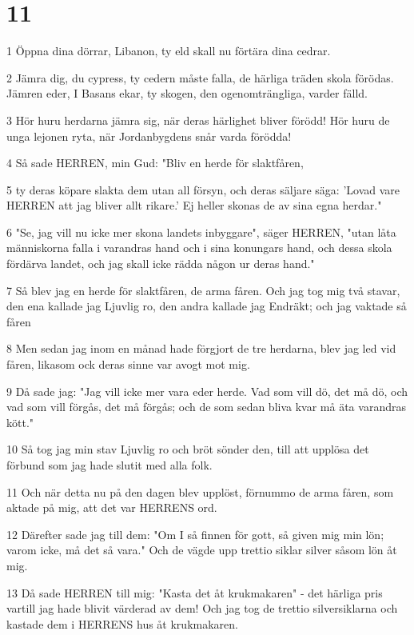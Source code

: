 \chapter{11}

\par 1 Öppna dina dörrar, Libanon, ty eld skall nu förtära dina cedrar.
\par 2 Jämra dig, du cypress, ty cedern måste falla, de härliga träden skola förödas. Jämren eder, I Basans ekar, ty skogen, den ogenomträngliga, varder fälld.
\par 3 Hör huru herdarna jämra sig, när deras härlighet bliver förödd! Hör huru de unga lejonen ryta, när Jordanbygdens snår varda förödda!
\par 4 Så sade HERREN, min Gud: "Bliv en herde för slaktfåren,
\par 5 ty deras köpare slakta dem utan all försyn, och deras säljare säga: 'Lovad vare HERREN att jag bliver allt rikare.' Ej heller skonas de av sina egna herdar."
\par 6 "Se, jag vill nu icke mer skona landets inbyggare", säger HERREN, "utan låta människorna falla i varandras hand och i sina konungars hand, och dessa skola fördärva landet, och jag skall icke rädda någon ur deras hand."
\par 7 Så blev jag en herde för slaktfåren, de arma fåren. Och jag tog mig två stavar, den ena kallade jag Ljuvlig ro, den andra kallade jag Endräkt; och jag vaktade så fåren
\par 8 Men sedan jag inom en månad hade förgjort de tre herdarna, blev jag led vid fåren, likasom ock deras sinne var avogt mot mig.
\par 9 Då sade jag: "Jag vill icke mer vara eder herde. Vad som vill dö, det må dö, och vad som vill förgås, det må förgås; och de som sedan bliva kvar må äta varandras kött."
\par 10 Så tog jag min stav Ljuvlig ro och bröt sönder den, till att upplösa det förbund som jag hade slutit med alla folk.
\par 11 Och när detta nu på den dagen blev upplöst, förnummo de arma fåren, som aktade på mig, att det var HERRENS ord.
\par 12 Därefter sade jag till dem: "Om I så finnen för gott, så given mig min lön; varom icke, må det så vara." Och de vägde upp trettio siklar silver såsom lön åt mig.
\par 13 Då sade HERREN till mig: "Kasta det åt krukmakaren" - det härliga pris vartill jag hade blivit värderad av dem! Och jag tog de trettio silversiklarna och kastade dem i HERRENS hus åt krukmakaren.
